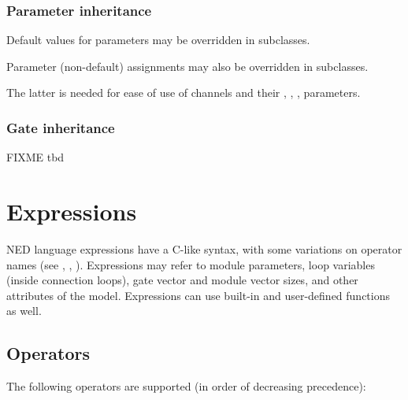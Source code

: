 \subsubsection{Parameter inheritance}

Default values for parameters may be overridden in subclasses.

Parameter (non-default) assignments may also be overridden in subclasses.

\begin{rationale}
    The latter is needed for ease of use of channels and their ,
    , ,  parameters.
\end{rationale}

\subsubsection{Gate inheritance}

FIXME tbd



\section{Expressions}
\label{ch-ned-ref:sec:expressions}

NED language expressions have a C-like syntax, with
some variations on operator names (see \ttt{\textasciicircum}, \ttt{\#}, \ttt{\#\#}).
Expressions may refer to module parameters, loop variables (inside connection
 loops), gate vector and module vector sizes, and other attributes
of the model. Expressions can use built-in and user-defined functions as well.

\subsection{Operators}

The following operators are supported (in order of decreasing precedence):

